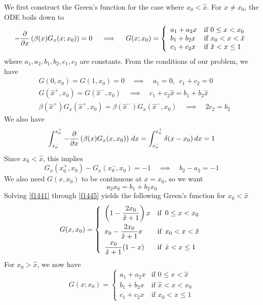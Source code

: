 We first construct the Green's function for the case where $x_0 < \hat{x}$. For $x \neq x_0$, the ODE boils down to
$$
-\frac{\partial}{\partial x} \left( \beta(x) G_x(x;x_0) \right) = 0 \quad \implies \quad G(x;x_0) = \left\{
\begin{array}{ll}
a_1 + a_2 x & \text{if} \,\, 0 \leq x < x_0 \\
b_1 + b_2 x & \text{if} \,\, x_0 < x < \hat{x} \\
c_1 + c_2 x & \text{if} \,\, \hat{x} < x \leq 1
\end{array} \right.
$$
where $a_1, a_2, b_1, b_2, c_1, c_2$ are constants. From the conditions of our problem, we have
\begin{align}
\label{f1441} &G(0,x_0) = G(1,x_0) = 0 \quad \implies \quad a_1 = 0, \,\,\, c_1 + c_2 = 0 \\
\label{f1442} &G(\hat{x}^+,x_0) = G(\hat{x}^-,x_0) \quad \implies \quad c_1 + c_2 \hat{x} = b_1 + b_2 \hat{x} \\
\label{f1443} &\beta(\hat{x}^+)G_x(\hat{x}^+,x_0) = \beta(\hat{x}^-)G_x(\hat{x}^-,x_0) \quad \implies \quad 2c_2 = b_2
\end{align}
We also have
$$ \int_{x_0^-}^{x_0^+} -\frac{\partial}{\partial x} \left( \beta(x) G_x(x,x_0) \right) \, dx = \int_{x_0^-}^{x_0^+} \delta(x-x_0) \, dx = 1 $$
Since $x_0 < \hat{x}$, this implies
\begin{equation}
\label{f1444} G_x(x_0^+,x_0) - G_x(x_0^-, x_0) = -1 \quad \implies \quad b_2 - a_2 = -1
\end{equation}
We also need $G(x,x_0)$ to be continuous at $x=x_0$, so we want
\begin{equation}
\label{f1445} a_2 x_0 = b_1 + b_2 x_0
\end{equation}
Solving \eqref{f1441} through \eqref{f1445} yields the following Green's function for $x_0 < \hat{x}$
$$ G(x,x_0) =
\left\{
\begin{array}{ll}
\left( 1 -\dfrac{2x_0}{\hat{x}+1} \right) x & \text{if} \,\,\, 0 \leq x < x_0 \\ \asep
x_0 - \dfrac{2x_0}{\hat{x}+1} x & \text{if} \,\,\, x_0 < x < \hat{x} \\ \asep
\dfrac{x_0}{\hat{x}+1} (1-x) & \text{if} \,\,\, \hat{x} < x \leq 1
\end{array}
\right. $$
For $x_0 > \hat{x}$, we now have
$$ G(x;x_0) = \left\{
\begin{array}{ll}
a_1 + a_2 x & \text{if} \,\, 0 \leq x < \hat{x} \\
b_1 + b_2 x & \text{if} \,\, \hat{x} < x < x_0 \\
c_1 + c_2 x & \text{if} \,\, x_0 < x \leq 1
\end{array} \right.
$$
